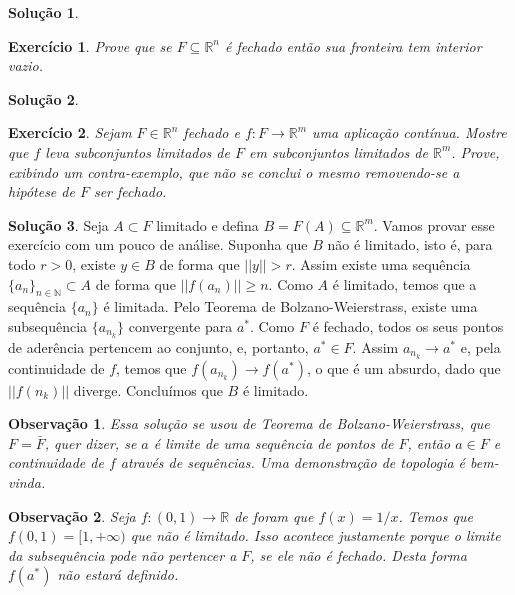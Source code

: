 \documentclass[a4paper,12pt]{article}
\newcommand{\R}{\mathbb{R}}
\theoremstyle{exer}
\newtheorem{exercise}{Exercício}
\theoremstyle{definition}
\newtheorem{solution}{Solução}
\theoremstyle{plain}
\newtheorem{remark}{Observação}
\begin{document}
\begin{solution}

\end{solution}

\begin{exercise}
    Prove que se $F \subseteq \R^n$ é fechado então sua fronteira tem interior vazio.
\end{exercise}

\begin{solution}

\end{solution}

\begin{exercise}
    Sejam $F \in \R^n$ fechado e $f : F \to \R^m$ uma aplicação contínua.
    Mostre que $f$ leva subconjuntos limitados de $F$ em subconjuntos
    limitados de $\R^m$. Prove, exibindo um contra-exemplo, que não se conclui o mesmo removendo-se a hipótese de $F$ ser fechado.
\end{exercise}

\begin{solution}
    Seja $A \subset F$ limitado e defina $B = F(A) \subseteq \R^m$. Vamos
    provar esse exercício com um pouco de análise. Suponha que $B$ não é
    limitado, isto é, para todo $r > 0$, existe $y \in B$ de forma que $||y||
    > r$. Assim existe uma sequência $\{a_n\}_{n \in \mathbb{N}} \subset
    A$ de forma que $||f(a_n)|| \ge n$. Como $A$ é limitado, temos que a
    sequência $\{a_n\}$ é limitada. Pelo Teorema de Bolzano-Weierstrass,
    existe uma subsequência $\{a_{n_k}\}$ convergente para $a^*$. Como $F$ é fechado, todos os seus pontos de aderência pertencem ao
    conjunto, e, portanto, $a^* \in F$. Assim $a_{n_k} \to a^*$ e, pela
    continuidade de $f$, temos que $f(a_{n_k}) \to f(a^*)$, o que é um
    absurdo, dado que $||f(n_k)||$ diverge. Concluímos que $B$ é limitado.
\end{solution}

\begin{remark}
    Essa solução se usou de Teorema de Bolzano-Weierstrass, que $F =
    \bar{F}$, quer dizer, se $a$ é limite de uma sequência de pontos de $F$,
    então $a \in F$ e continuidade de $f$ através de sequências. Uma
    demonstração de topologia é bem-vinda. 
\end{remark}

\begin{remark}
    Seja $f : (0,1) \to \R$ de foram que $f(x) = 1/x$. Temos que $f(0,1) = [1,
    + \infty)$ que não é limitado. Isso acontece justamente porque o limite da
    subsequência pode não pertencer a $F$, se ele não é fechado. Desta forma
    $f(a^*)$ não estará definido. 
\end{remark}
\end{document}
